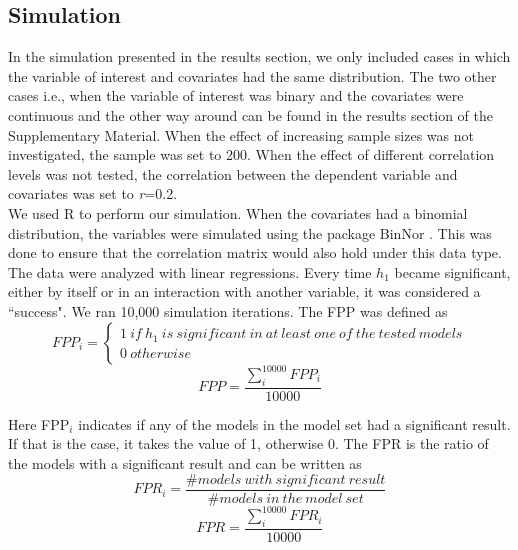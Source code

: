 \subsection{Simulation}
In the simulation presented in the results section, we only included cases in which the variable of interest and covariates had the same distribution. The two other cases i.e., when the variable of interest was binary and the covariates were continuous and the other way around can be found in the results section of the Supplementary Material. When the effect of increasing sample sizes was not investigated, the sample was set to 200. When the effect of different correlation levels was not tested, the correlation between the dependent variable and covariates was set to \textit{r}=0.2.\\
We used R \citep{Team2018} to perform our simulation. When the covariates had a binomial distribution, the variables were simulated using the package BinNor \citep{Demirtas2014}. This was done to ensure that the correlation matrix would also hold under this data type. The data were analyzed with linear regressions. Every time $h_1$ became significant, either by itself or in an interaction with another variable, it was considered a “success". We ran 10,000 simulation iterations. The FPP was defined as \\

\[FPP_i=\left. \left\{\begin{array}{c}
1\ if\ h_1\ is\ significant\ in\ at\ least\ one \ of\ the\ tested\ models \\ 
0\ otherwise\  \end{array}
\right.\] 
\[FPP=\frac{\sum^{10000}_i{FPP_i}}{10000}\] 


Here FPP${}_{i}$ indicates if any of the models in the model set had a significant result. If that is the case, it takes the value of 1, otherwise 0. The FPR is the ratio of the models with a significant result and can be written as \\

\[FPR_i=\frac{\#models\ with\ significant\ result}{\#models\ in\ the\ model\ set}\] 
\[FPR=\frac{\sum^{10000}_i{FPR_i}}{10000}\] 



